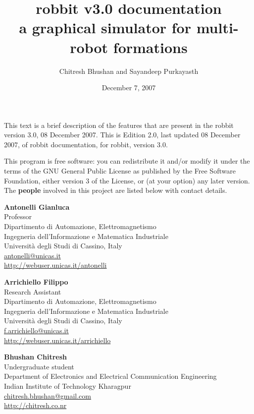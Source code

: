 \documentclass[10pt,a4paper]{article}
\newcommand{\ns}{\vspace{6pt}\noindent}
\begin{document}
\sf %
\title{{\bf robbit v3.0 documentation} \\ a graphical simulator for multi-robot formations}
\author{Chitresh Bhushan and Sayandeep Purkayasth}
\date{December 7, 2007}
\maketitle
\newpage
This text is a brief description of the features that are present in the robbit version 3.0, 08 December 2007. This is Edition 2.0, last updated 08 December 2007, of robbit documentation, for robbit, version 3.0.

\ns
\par \narrower \narrower
	This program is free software: you can redistribute it and/or modify
    it under the terms of the GNU General Public License as published by
    the Free Software Foundation, either version 3 of the License, or
    (at your option) any later version.
\newpage
\noindent The \textbf{people} involved in this project are listed below with contact details.

\ns
\noindent
{\bf Antonelli Gianluca} \\
Professor \\
Dipartimento di Automazione, Elettromagnetismo \\
Ingegneria dell'Informazione e Matematica Industriale \\
Universit\`a degli Studi di Cassino, Italy \\
\href{mailto:antonelli@unicas.it}{antonelli@unicas.it} \\
\href{http://webuser.unicas.it/antonelli}{http://webuser.unicas.it/antonelli}

\ns
{\bf Arrichiello Filippo} \\
Research Assistant \\
Dipartimento di Automazione, Elettromagnetismo \\
Ingegneria dell'Informazione e Matematica Industriale \\
Universit\`a degli Studi di Cassino, Italy \\
\href{mailto:f.arrichiello@unicas.it}{f.arrichiello@unicas.it} \\
\href{http://webuser.unicas.it/arrichiello}{http://webuser.unicas.it/arrichiello}

\ns
{\bf Bhushan Chitresh} \\
Undergraduate student \\
Department of Electronics and Electrical Communication Engineering \\
Indian Institute of Technology Kharagpur \\
\href{mailto:chitresh.bhushan@gmail.com}{chitresh.bhushan@gmail.com} \\
\href{http://chitresh.co.nr}{http://chitresh.co.nr}
\end{document}

